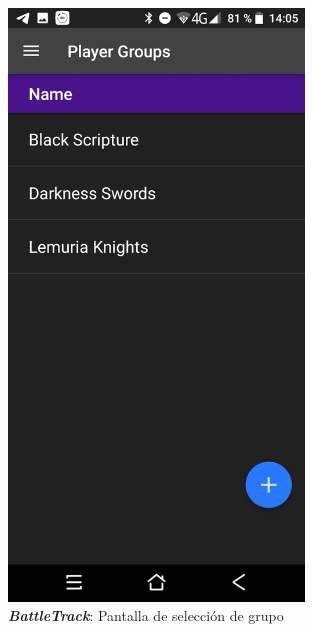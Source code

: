 \begin{figure}[H]
    \centering
    \begin{minipage}{0.3\textwidth}
        \centering
        \includegraphics[width=0.7\textwidth]{Images/BattleTrack_1.jpeg}
        \caption{\textit{\textbf{BattleTrack}}: Pantalla de selección 
        de grupo}
        

\end{minipage}
\end{figure}
